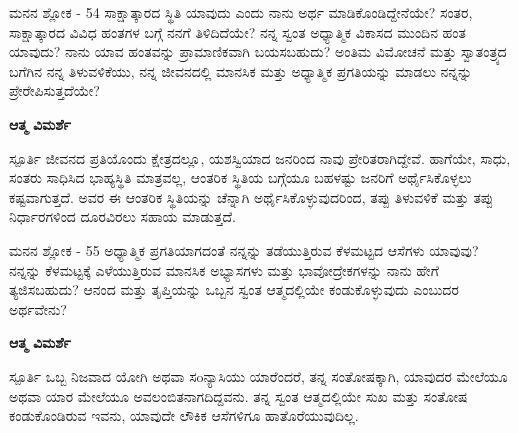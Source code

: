 \newpage
\begin{mananam}{\mananamfont ಮನನ ಶ್ಲೋಕ - \textenglish{54}}
\footnotesize \mananamtext ಸಾಕ್ಷಾತ್ಕಾರದ ಸ್ಥಿತಿ ಯಾವುದು ಎಂದು ನಾನು ಅರ್ಥ ಮಾಡಿಕೊಂಡಿದ್ದೇನೆಯೇ? ಸಂತರ,  ಸಾಕ್ಷಾತ್ಕಾರದ  ವಿವಿಧ ಹಂತಗಳ ಬಗ್ಗೆ ನನಗೆ ತಿಳಿದಿದೆಯೇ? ನನ್ನ ಸ್ವಂತ ಅಧ್ಯಾತ್ಮಿಕ ವಿಕಾಸದ ಮುಂದಿನ ಹಂತ ಯಾವುದು? ನಾನು ಯಾವ ಹಂತವನ್ನು ಪ್ರಾಮಾಣಿಕವಾಗಿ ಬಯಸಬಹುದು? ಅಂತಿಮ ವಿಮೋಚನೆ ಮತ್ತು ಸ್ವಾತಂತ್ರ್ಯದ ಬಗೆಗಿನ ನನ್ನ ತಿಳುವಳಿಕೆಯು,  ನನ್ನ ಜೀವನದಲ್ಲಿ ಮಾನಸಿಕ ಮತ್ತು ಅಧ್ಯಾತ್ಮಿಕ ಪ್ರಗತಿಯನ್ನು ಮಾಡಲು  ನನ್ನನ್ನು ಪ್ರೇರೇಪಿಸುತ್ತದೆಯೇ?
\end{mananam}
\WritingHand\enspace\textbf{ಆತ್ಮ ವಿಮರ್ಶೆ}
\begin{inspiration}{\mananamfont ಸ್ಪೂರ್ತಿ}
\footnotesize \mananamtext ಜೀವನದ ಪ್ರತಿಯೊಂದು ಕ್ಷೇತ್ರದಲ್ಲೂ,  ಯಶಸ್ವಿಯಾದ ಜನರಿಂದ ನಾವು ಪ್ರೇರಿತರಾಗಿದ್ದೇವೆ. ಹಾಗೆಯೇ, ಸಾಧು, ಸಂತರು ಸಾಧಿಸಿದ ಭಾಹ್ಯಸ್ಥಿತಿ ಮಾತ್ರವಲ್ಲ, ಆಂತರಿಕ ಸ್ಥಿತಿಯ ಬಗ್ಗೆಯೂ ಬಹಳಷ್ಟು ಜನರಿಗೆ ಅರ್ಥೈಸಿಕೊಳ್ಳಲು ಕಷ್ಟವಾಗುತ್ತದೆ. ಅವರ ಈ ಆಂತರಿಕ ಸ್ಥಿತಿಯನ್ನು ಚೆನ್ನಾಗಿ ಅರ್ಥೈಸಿಕೊಳ್ಳುವುದರಿಂದ, ತಪ್ಪು ತಿಳುವಳಿಕೆ ಮತ್ತು ತಪ್ಪು ನಿರ್ಧಾರಗಳಿಂದ ದೂರವಿರಲು ಸಹಾಯ ಮಾಡುತ್ತದೆ.
\end{inspiration}
\newpage



\newpage
\begin{mananam}{\mananamfont ಮನನ ಶ್ಲೋಕ - \textenglish{55}}
\footnotesize \mananamtext ಅಧ್ಯಾತ್ಮಿಕ ಪ್ರಗತಿಯಾಗದಂತೆ ನನ್ನನ್ನು ತಡೆಯುತ್ತಿರುವ ಕೆಳಮಟ್ಟದ ಆಸೆಗಳು ಯಾವುವು? ನನ್ನನ್ನು ಕೆಳಮಟ್ಟಕ್ಕೆ ಎಳೆಯುತ್ತಿರುವ ಮಾನಸಿಕ ಅಭ್ಯಾಸಗಳು ಮತ್ತು ಭಾವೋದ್ರೇಕಗಳನ್ನು   ನಾನು ಹೇಗೆ ತ್ಯಜಿಸಬಹುದು? ಆನಂದ ಮತ್ತು ತೃಪ್ತಿಯನ್ನು ಒಬ್ಬನ ಸ್ವಂತ ಆತ್ಮದಲ್ಲಿಯೇ ಕಂಡುಕೊಳ್ಳುವುದು ಎಂಬುದರ ಅರ್ಥವೇನು?
\end{mananam}
\WritingHand\enspace\textbf{ಆತ್ಮ ವಿಮರ್ಶೆ}
\begin{inspiration}{\mananamfont ಸ್ಪೂರ್ತಿ}
\footnotesize \mananamtext  ಒಬ್ಬ ನಿಜವಾದ ಯೋಗಿ ಅಥವಾ ಸoನ್ಯಾಸಿಯು ಯಾರೆಂದರೆ, ತನ್ನ ಸಂತೋಷಕ್ಕಾಗಿ, ಯಾವುದರ ಮೇಲೆಯೂ ಅಥವಾ ಯಾರ ಮೇಲೆಯೂ ಅವಲಂಬಿತನಾಗದಿದ್ದವನು. ತನ್ನ ಸ್ವಂತ ಆತ್ಮದಲ್ಲಿಯೇ ಸುಖ ಮತ್ತು ಸಂತೋಷ ಕಂಡುಕೊಂಡಿರುವ ಇವನು, ಯಾವುದೇ ಲೌಕಿಕ ಆಸೆಗಳಿಗೂ ಹಾತೊರೆಯುವುದಿಲ್ಲ.
\end{inspiration}
\newpage

